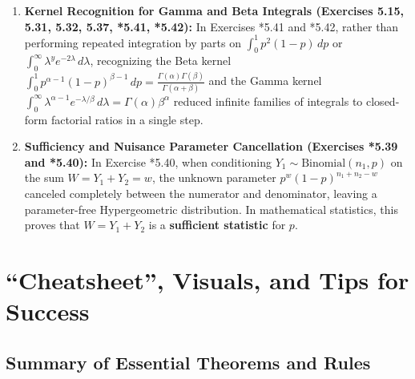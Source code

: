 \documentclass[11pt, letterpaper]{article}
\theoremstyle{definition}
\theoremstyle{remark}
\begin{document}
\begin{enumerate}
    \item \textbf{Kernel Recognition for Gamma and Beta Integrals (Exercises 5.15, 5.31, 5.32, 5.37, *5.41, *5.42):}
    In Exercises *5.41 and *5.42, rather than performing repeated integration by parts on $\int_0^1 p^2(1-p) \, dp$ or $\int_0^\infty \lambda^y e^{-2\lambda} \, d\lambda$, recognizing the Beta kernel $\int_0^1 p^{\alpha-1}(1-p)^{\beta-1} \, dp = \frac{\Gamma(\alpha)\Gamma(\beta)}{\Gamma(\alpha+\beta)}$ and the Gamma kernel $\int_0^\infty \lambda^{\alpha-1} e^{-\lambda/\beta} \, d\lambda = \Gamma(\alpha)\beta^\alpha$ reduced infinite families of integrals to closed-form factorial ratios in a single step.
    \item \textbf{Sufficiency and Nuisance Parameter Cancellation (Exercises *5.39 and *5.40):}
    In Exercise *5.40, when conditioning $Y_1 \sim \text{Binomial}(n_1, p)$ on the sum $W = Y_1 + Y_2 = w$, the unknown parameter $p^w (1-p)^{n_1+n_2-w}$ canceled completely between the numerator and denominator, leaving a parameter-free Hypergeometric distribution. In mathematical statistics, this proves that $W = Y_1 + Y_2$ is a \textbf{sufficient statistic} for $p$.
\end{enumerate}

\newpage
\section{``Cheatsheet'', Visuals, and Tips for Success}

\subsection{Summary of Essential Theorems and Rules}
\end{document}
